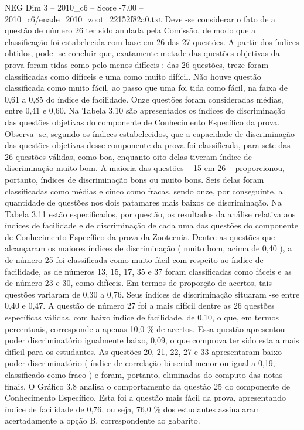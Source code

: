 \begin{textsample}{NEG Dim 3 – 2010\_c6 – Score -7.00 – 2010\_c6/enade\_2010\_zoot\_22152f82a0.txt}
Deve -se considerar o fato de a questão de número 26 ter sido anulada pela Comissão, de modo que a classificação foi estabelecida com base em 26 das 27 questões.
A partir dos índices obtidos, pode -se concluir que, exatamente metade das questões objetivas da prova foram tidas como pelo menos difíceis : das 26 questões, treze foram classificadas como difíceis e uma como muito difícil.
Não houve questão classificada como muito fácil, ao passo que uma foi tida como fácil, na faixa de 0,61 a 0,85 do índice de facilidade.
Onze questões foram consideradas médias, entre 0,41 e 0,60.
Na Tabela 3.10 são apresentados os índices de discriminação das questões objetivas do componente de Conhecimento Específico da prova.
Observa -se, segundo os índices estabelecidos, que a capacidade de discriminação das questões objetivas desse componente da prova foi classificada, para sete das 26 questões válidas, como boa, enquanto oito delas tiveram índice de discriminação muito bom.
A maioria das questões – 15 em 26 – proporcionou, portanto, índices de discriminação bons ou muito bons.
Seis delas foram classificadas como médias e cinco como fracas, sendo onze, por conseguinte, a quantidade de questões nos dois patamares mais baixos de discriminação.
Na Tabela 3.11 estão especificados, por questão, os resultados da análise relativa aos índices de facilidade e de discriminação de cada uma das questões do componente de Conhecimento Específico da prova da Zootecnia.
Dentre as questões que alcançaram os maiores índices de discriminação ( muito bom, acima de 0,40 ), a de número 25 foi classificada como muito fácil com respeito ao índice de facilidade, as de números 13, 15, 17, 35 e 37 foram classificadas como fáceis e as de número 23 e 30, como difíceis.
Em termos de proporção de acertos, tais questões variaram de 0,30 a 0,76.
Seus índices de discriminação situaram -se entre 0,40 e 0,47.
A questão de número 27 foi a mais difícil dentre as 26 questões específicas válidas, com baixo índice de facilidade, de 0,10, o que, em termos percentuais, corresponde a apenas 10,0 \% de acertos.
Essa questão apresentou poder discriminatório igualmente baixo, 0,09, o que comprova ter sido esta a mais difícil para os estudantes.
As questões 20, 21, 22, 27 e 33 apresentaram baixo poder discriminatório ( índice de correlação bi-serial menor ou igual a 0,19, classificado como fraco ) e foram, portanto, eliminadas do computo das notas finais.
O Gráfico 3.8 analisa o comportamento da questão 25 do componente de Conhecimento Específico.
Esta foi a questão mais fácil da prova, apresentando índice de facilidade de 0,76, ou seja, 76,0 \% dos estudantes assinalaram acertadamente a opção B, correspondente ao gabarito.

\end{textsample}
